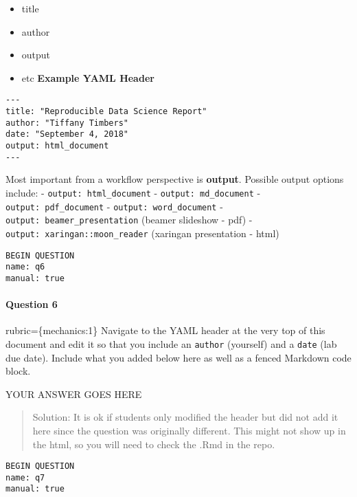 \documentclass[
]{article}
\providecommand{\tightlist}{%
  \setlength{\itemsep}{0pt}\setlength{\parskip}{0pt}}
\begin{document}
\begin{itemize}
\tightlist
\item
  title
\item
  author
\item
  output
\item
  etc \textbf{Example YAML Header}
\end{itemize}

\begin{verbatim}
---
title: "Reproducible Data Science Report"
author: "Tiffany Timbers"
date: "September 4, 2018"
output: html_document
---
\end{verbatim}

Most important from a workflow perspective is \textbf{output}. Possible
output options include: - \texttt{output:\ html\_document} -
\texttt{output:\ md\_document} - \texttt{output:\ pdf\_document} -
\texttt{output:\ word\_document} -
\texttt{output:\ beamer\_presentation} (beamer slideshow - pdf) -
\texttt{output:\ xaringan::moon\_reader} (xaringan presentation - html)

\begin{verbatim}
BEGIN QUESTION
name: q6
manual: true
\end{verbatim}

\begin{alert alert-info}
\hypertarget{question-6}{%
\paragraph{Question 6}\label{question-6}}

rubric=\{mechanics:1\} Navigate to the YAML header at the very top of
this document and edit it so that you include an \texttt{author}
(yourself) and a \texttt{date} (lab due date). Include what you added
below here as well as a fenced Markdown code block.
\end{alert alert-info}

YOUR ANSWER GOES HERE

\begin{quote}
Solution: It is ok if students only modified the header but did not add
it here since the question was originally different. This might not show
up in the html, so you will need to check the .Rmd in the repo.
\end{quote}

\begin{verbatim}
BEGIN QUESTION
name: q7
manual: true
\end{verbatim}
\end{document}
